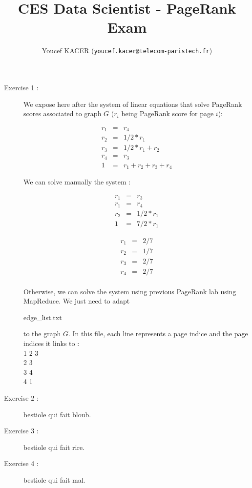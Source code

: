 \documentclass[pdftex,a4paper,DIV15]{scrartcl}
\title{
CES Data Scientist - PageRank Exam}
\author{Youcef KACER (\texttt{youcef.kacer@telecom-paristech.fr})}
\begin{document}
\maketitle


\begin{description} %

\item[Exercise 1 :] We expose here after the system of linear equations that solve PageRank scores associated to graph $G$ ($r_{i}$ being PageRank score for page $i$):

\begin{eqnarray*} %
r_1 &=& r_4\\
r_2 &=& 1/2*r_1\\
r_3 &=& 1/2*r_1 + r_2\\
r_4 &=& r_3\\
1   &=& r_1 + r_2 + r_3 + r_4
\end{eqnarray*}

We can solve manually the system :

\begin{eqnarray*} %
r_1 &=& r_3\\
r_1 &=& r_4\\
r_2 &=& 1/2*r_1 \\
1   &=& 7/2*r_1
\end{eqnarray*}

\begin{eqnarray*} %
r_1 &=& 2/7\\
r_2 &=& 1/7\\
r_3 &=& 2/7\\
r_4 &=& 2/7
\end{eqnarray*}
\\

Otherwise, we can solve the system using previous PageRank lab using MapReduce. We just need to adapt \begin{itshape}edge\_list.txt\end{itshape} to the graph $G$. 
In this file, each line represents a page indice and the page indices it links to :\\

1 2 3\\
2 3\\
3 4\\
4 1\\

\item[Exercise 2 :] bestiole qui fait bloub.
\item[Exercise 3 :] bestiole qui fait rire.
\item[Exercise 4 :] bestiole qui fait mal.

\end{description}
\end{document}
